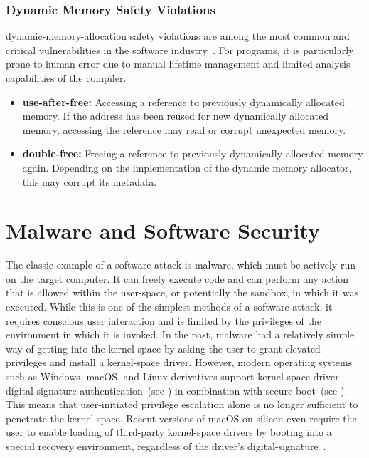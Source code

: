 \subsubsection{Dynamic Memory Safety Violations}
\label{sec:dyn_mem_viol}

\Gls{dynamic-memory-allocation} safety violations are among the most common and critical vulnerabilities in the software industry~\cite{buff-ovf}. For  programs, it is particularly prone to human error due to manual lifetime management and limited analysis capabilities of the compiler.

\begin{itemize}
  \item \textbf{\Gls{use-after-free}:} Accessing a reference to previously dynamically allocated memory. If the address has been reused for new dynamically allocated memory, accessing the reference may read or corrupt unexpected memory.
  \item \textbf{\Gls{double-free}:} Freeing a reference to previously dynamically allocated memory again. Depending on the implementation of the dynamic memory allocator, this may corrupt its metadata.
\end{itemize}

\section{Malware and Software Security}

The classic example of a software attack is malware, which must be actively run on the target computer. It can freely execute code and can perform any action that is allowed within the \gls{user-space}, or potentially the sandbox, in which it was executed. While this is one of the simplest methods of a software attack, it requires conscious user interaction and is limited by the privileges of the environment in which it is invoked. In the past, malware had a relatively simple way of getting into the \gls{kernel-space} by asking the user to grant elevated privileges and install a \gls{kernel-space} driver. However, modern operating systems such as Windows, macOS, and Linux derivatives support \gls{kernel-space} driver \gls{digital-signature} authentication~(see ) in combination with \gls{secure-boot}~(see ). This means that user-initiated privilege escalation alone is no longer sufficient to penetrate the \gls{kernel-space}. Recent versions of macOS on  silicon even require the user to enable loading of third-party \gls{kernel-space} drivers by booting into a special recovery environment, regardless of the driver's \gls{digital-signature}~\cite{macOS-security-settings}.

